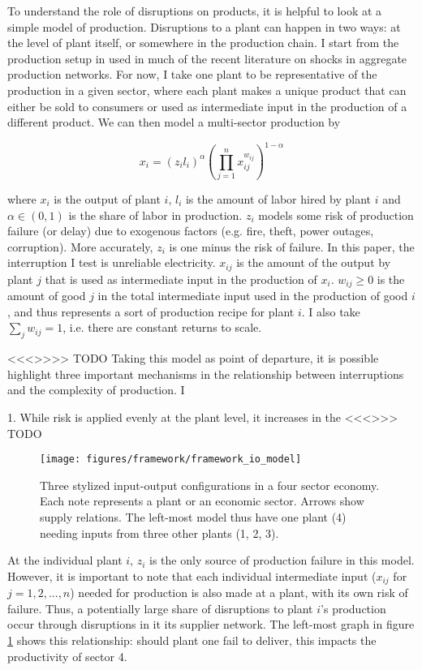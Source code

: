 \documentclass[11pt]{article}
\begin{document}
To understand the role of disruptions on products, it is helpful to look at a simple model of production. Disruptions to a plant can happen in two ways: at the level of plant itself, or somewhere in the production chain. I start from the production setup in \cite{acemoglu_network_2012} used in much of the recent literature on shocks in aggregate production networks. For now, I take one plant to be representative of the production in a given sector, where each plant makes a unique product that can either be sold to consumers or used as intermediate input in the production of a different product. We can then model a multi-sector production by

\[
x_i =  (z_i l_i)^{\alpha}(\prod^{n}_{j = 1} x_{ij}^{w_{ij}})^{1 - \alpha}
\]

where $x_i$ is the output of plant $i$, \(l_i\) is the amount of labor hired by plant \(i\) and \(\alpha \in (0, 1)\) is the share of labor in production. \(z_i\) models some risk of production failure (or delay) due to exogenous factors (e.g. fire, theft, power outages, corruption). More accurately, \(z_i\) is one minus the risk of failure. In this paper, the interruption I test is unreliable electricity. \(x_{ij}\) is the amount of the output by plant \(j\) that is used as intermediate input in the production of \(x_i\). \(w_{ij} \geq 0\) is the amount of good \(j\) in the total intermediate input used in the production of good \(i\), and thus represents a sort of production recipe for plant \(i\). I also take \(\sum_j w_{ij} = 1\), i.e. there are constant returns to scale.


<<<>>>> TODO
Taking this model as point of departure, it is possible highlight three important mechanisms in the relationship between interruptions and the complexity of production. I 

1. While risk is applied evenly at the plant level, it increases in the 
<<<>>> TODO 



\begin{figure}[htpb]
	\centering
	\texttt{[image: figures/framework/framework\_io\_model]}
	\caption{Three stylized input-output configurations in a four sector economy. Each note represents a plant or an economic sector. Arrows show supply relations. The left-most model thus have one plant (4) needing inputs from three other plants (1, 2, 3).}%
	\label{fig:framework-io-model}
\end{figure}

At the individual plant \(i\), \(z_i\) is the only source of production failure in this model. However, it is important to note that each individual intermediate input (\(x_{ij}\) for \(j = 1, 2, ..., n\)) needed for production is also made at a plant, with its own risk of failure. Thus, a potentially large share of disruptions to plant $i$'s production occur through disruptions in it its supplier network. The left-most graph in figure \ref{fig:framework-io-model} shows this relationship: should plant one fail to deliver, this impacts the productivity of sector 4.
\end{document}
